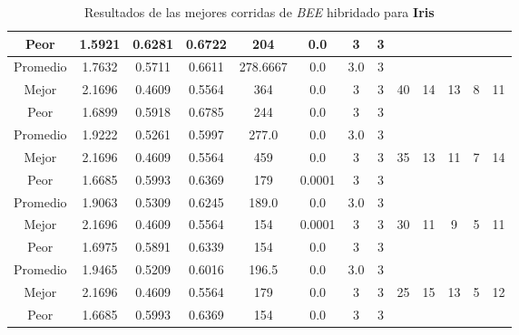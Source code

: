 \begin{table}[h!]
\begin{center}
\begin{tabular}{|c|c|c|c|c|c|c|c|c|c|c|c|c|}
            \cline{1-8}
            Peor & 1.5921 & 0.6281  & 0.6722 & 204 & 0.0 & 3 & 3 &  &  &  &  & \\
        \hline
        \hline
            Promedio  & 1.7632 & 0.5711 & 0.6611 & 278.6667 & 0.0 & 3.0 & 3 &  &  &  &  & \\
            \cline{1-8}
            Mejor & 2.1696 & 0.4609  & 0.5564 & 364 & 0.0 & 3 & 3 & 40 & 14 & 13 & 8 & 11\\
            \cline{1-8}
            Peor & 1.6899 & 0.5918  & 0.6785 & 244 & 0.0 & 3 & 3 &  &  &  &  & \\
        \hline
        \hline
            Promedio  & 1.9222 & 0.5261 & 0.5997 & 277.0 & 0.0 & 3.0 & 3 &  &  &  &  & \\
            \cline{1-8}
            Mejor & 2.1696 & 0.4609  & 0.5564 & 459 & 0.0 & 3 & 3 & 35 & 13 & 11 & 7 & 14\\
            \cline{1-8}
            Peor & 1.6685 & 0.5993  & 0.6369 & 179 & 0.0001 & 3 & 3 &  &  &  &  & \\
        \hline
        \hline
            Promedio  & 1.9063 & 0.5309 & 0.6245 & 189.0 & 0.0 & 3.0 & 3 &  &  &  &  & \\
            \cline{1-8}
            Mejor & 2.1696 & 0.4609  & 0.5564 & 154 & 0.0001 & 3 & 3 & 30 & 11 & 9 & 5 & 11\\
            \cline{1-8}
            Peor & 1.6975 & 0.5891  & 0.6339 & 154 & 0.0 & 3 & 3 &  &  &  &  & \\
        \hline
        \hline
            Promedio  & 1.9465 & 0.5209 & 0.6016 & 196.5 & 0.0 & 3.0 & 3 &  &  &  &  & \\
            \cline{1-8}
            Mejor & 2.1696 & 0.4609  & 0.5564 & 179 & 0.0 & 3 & 3 & 25 & 15 & 13 & 5 & 12\\
            \cline{1-8}
            Peor & 1.6685 & 0.5993  & 0.6369 & 154 & 0.0 & 3 & 3 &  &  &  &  & \\
        \hline
        \end{tabular}
        \caption{Resultados de las mejores corridas de \emph{BEE} hibridado para {\bf Iris}}
        \label{tb:tablebeehibcsv}
    \end{center}
\end{table}



